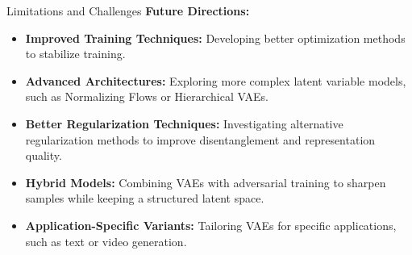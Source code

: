 \begin{frame}[allowframebreaks]{Limitations and Challenges}
\textbf{Future Directions:}
\begin{itemize}
    \item \textbf{Improved Training Techniques:} Developing better optimization methods to stabilize training.
    \item \textbf{Advanced Architectures:} Exploring more complex latent variable models, such as Normalizing Flows or Hierarchical VAEs.
    \item \textbf{Better Regularization Techniques:} Investigating alternative regularization methods to improve disentanglement and representation quality.
    \item \textbf{Hybrid Models:} Combining VAEs with adversarial training to sharpen samples while keeping a structured latent space.
    \item \textbf{Application-Specific Variants:} Tailoring VAEs for specific applications, such as text or video generation.
\end{itemize}
\end{frame}